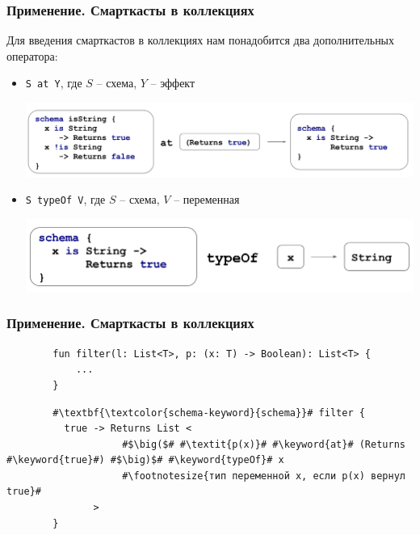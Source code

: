 \documentclass{beamer}
\newcommand{\code}[1]{\texttt{#1}}
\newcommand{\keyword}[1]{\textbf{\textcolor{schema-keyword}{#1}}}
\begin{document}
\begin{frame}[fragile, t]\frametitle{Применение. Смарткасты в коллекциях}
    Для введения смарткастов в коллекциях нам понадобится два дополнительных оператора:
    
    \begin{itemize}
        \item \code{S at Y}, где $S$ -- схема, $Y$ -- эффект
        
        \centerline{\includegraphics[width=\paperwidth]{at-operator}}
        
        \item \code{S typeOf V}, где $S$ -- схема, $V$ -- переменная
        
        \centerline{\includegraphics[width=\paperwidth]{typeof-operator}}
    \end{itemize}
\end{frame}

\begin{frame}[fragile, t]\frametitle{Применение. Смарткасты в коллекциях}
    \begin{verbatim}
        fun filter(l: List<T>, p: (x: T) -> Boolean): List<T> {
            ...
        }
    \end{verbatim}
    
    \begin{verbatim}
        #\textbf{\textcolor{schema-keyword}{schema}}# filter {
          true -> Returns List < 
                    #$\big($# #\textit{p(x)}# #\keyword{at}# (Returns #\keyword{true}#) #$\big)$# #\keyword{typeOf}# x 
                    #\footnotesize{тип переменной x, если p(x) вернул true}#
               >
        }
    \end{verbatim}
\end{frame}
\end{document}
